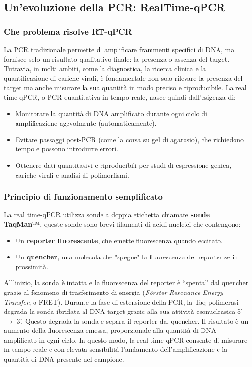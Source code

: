 \begin{noSplitBlock}

\subsection{Un'evoluzione della PCR: RealTime-qPCR}

\subsubsection{Che problema risolve RT-qPCR}
La PCR tradizionale permette di amplificare frammenti specifici di DNA, ma fornisce solo un risultato qualitativo finale: la presenza o assenza del target. Tuttavia, in molti ambiti, come la diagnostica, la ricerca clinica e la quantificazione di cariche virali, è fondamentale non solo rilevare la presenza del target ma anche misurare la sua quantità in modo preciso e riproducibile. La real time-qPCR, o PCR quantitativa in tempo reale, nasce quindi dall’esigenza di:
\begin{itemize}
    \item Monitorare la quantità di DNA amplificato durante ogni ciclo di amplificazione agevolmente (automaticamente).
    \item Evitare passaggi post-PCR (come la corsa su gel di agarosio), che richiedono tempo e possono introdurre errori.
    \item Ottenere dati quantitativi e riproducibili per studi di espressione genica, cariche virali e analisi di polimorfismi.
\end{itemize}

\subsubsection{Principio di funzionamento semplificato}
La real time-qPCR utilizza sonde a doppia etichetta chiamate \textbf{sonde TaqMan™}, queste sonde sono brevi filamenti di acidi nucleici che contengono:
\begin{itemize}
    \item Un \textbf{reporter fluorescente}, che emette fluorescenza quando eccitato.
    \item Un \textbf{quencher}, una molecola che "spegne" la fluorescenza del reporter se in prossimità.
\end{itemize}
\footnotesize{All’inizio, la sonda è intatta e la fluorescenza del reporter è “spenta” dal quencher grazie al fenomeno di trasferimento di energia (\emph{Förster Resonance Energy Transfer}, o FRET). Durante la fase di estensione della PCR, la Taq polimerasi degrada la sonda ibridata al DNA target grazie alla sua attività esonucleasica 5’ $\rightarrow$ 3’. Questo degrada la sonda e separa il reporter dal quencher. Il risultato è un aumento della fluorescenza emessa, proporzionale alla quantità di DNA amplificato in ogni ciclo. In questo modo, la real time-qPCR consente di misurare in tempo reale e con elevata sensibilità l’andamento dell’amplificazione e la quantità di DNA presente nel campione.}


\end{noSplitBlock}
